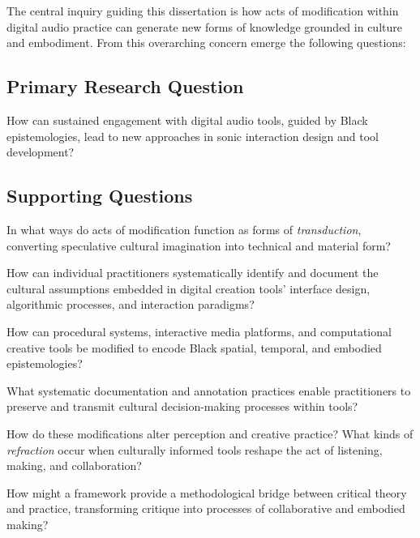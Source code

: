 The central inquiry guiding this dissertation is how acts of modification within digital audio practice can generate new forms of knowledge grounded in culture and embodiment. From this overarching concern emerge the following questions:

\subsection{Primary Research Question}

\noindent How can sustained engagement with digital audio tools, guided by Black epistemologies, lead to new approaches in sonic interaction design and tool development?

\subsection{ Supporting Questions}

\noindent In what ways do acts of modification function as forms of \textit{transduction}, converting speculative cultural imagination into technical and material form?

\medskip

\noindent How can individual practitioners systematically identify and document the cultural assumptions embedded in digital creation tools' interface design, algorithmic processes, and interaction paradigms?

\medskip

\noindent How can procedural systems, interactive media platforms, and computational creative tools be modified to encode Black spatial, temporal, and embodied epistemologies?

\medskip

\noindent What systematic documentation and annotation practices enable practitioners to preserve and transmit cultural decision-making processes within tools?

\medskip

\noindent How do these modifications alter perception and creative practice? What kinds of \textit{refraction} occur when culturally informed tools reshape the act of listening, making, and collaboration?

\medskip

\noindent How might a framework provide a methodological bridge between critical theory and practice, transforming critique into processes of collaborative and embodied making?